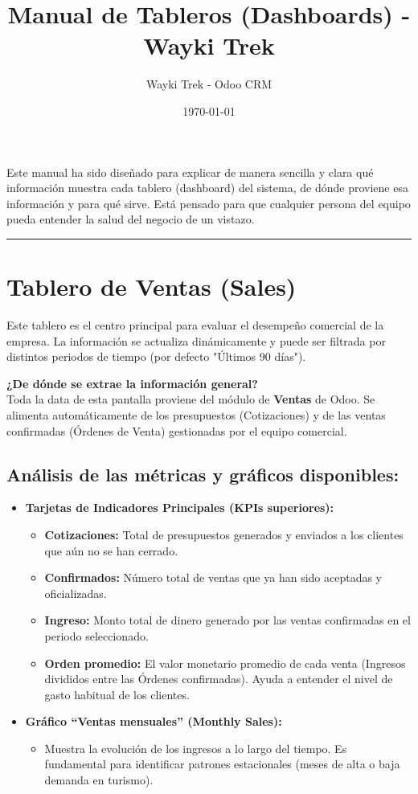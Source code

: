 \documentclass[11pt,a4paper]{article}
\title{\textbf{Manual de Tableros (Dashboards) - Wayki Trek}}
\author{Wayki Trek - Odoo CRM}
\date{\today}
\begin{document}
\maketitle

Este manual ha sido diseñado para explicar de manera sencilla y clara qué información muestra cada tablero (dashboard) del sistema, de dónde proviene esa información y para qué sirve. Está pensado para que cualquier persona del equipo pueda entender la salud del negocio de un vistazo.

\vspace{1cm}
\hrule
\vspace{1cm}

\section{Tablero de Ventas (Sales)}
Este tablero es el centro principal para evaluar el desempeño comercial de la empresa. La información se actualiza dinámicamente y puede ser filtrada por distintos periodos de tiempo (por defecto "Últimos 90 días").

\textbf{¿De dónde se extrae la información general?}\\
Toda la data de esta pantalla proviene del módulo de \textbf{Ventas} de Odoo. Se alimenta automáticamente de los presupuestos (Cotizaciones) y de las ventas confirmadas (Órdenes de Venta) gestionadas por el equipo comercial.

\subsection*{Análisis de las métricas y gráficos disponibles:}
\begin{itemize}[leftmargin=*]
    \item \textbf{Tarjetas de Indicadores Principales (KPIs superiores):}
    \begin{itemize}
        \item \textbf{Cotizaciones:} Total de presupuestos generados y enviados a los clientes que aún no se han cerrado.
        \item \textbf{Confirmados:} Número total de ventas que ya han sido aceptadas y oficializadas.
        \item \textbf{Ingreso:} Monto total de dinero generado por las ventas confirmadas en el periodo seleccionado.
        \item \textbf{Orden promedio:} El valor monetario promedio de cada venta (Ingresos divididos entre las Órdenes confirmadas). Ayuda a entender el nivel de gasto habitual de los clientes.
    \end{itemize}
    \item \textbf{Gráfico ``Ventas mensuales'' (Monthly Sales):}
    \begin{itemize}
        \item Muestra la evolución de los ingresos a lo largo del tiempo. Es fundamental para identificar patrones estacionales (meses de alta o baja demanda en turismo).
    \end{itemize}
\end{itemize}
\end{document}
